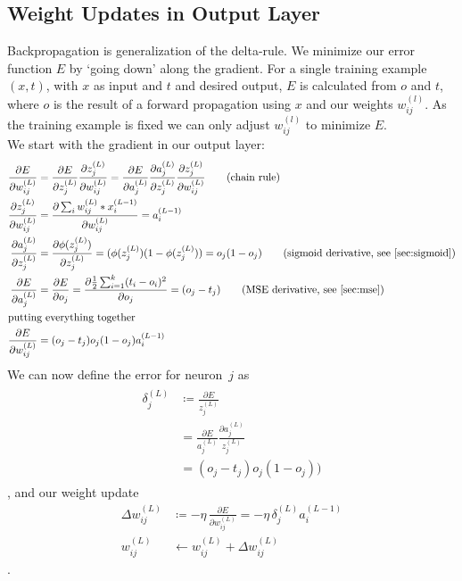 \subsection{Weight Updates in Output Layer}
Backpropagation is generalization of the delta-rule. We minimize our error function $E$ by `going down' along the gradient. For a single training example~$(x, t)$, with $x$ as input and $t$ and desired output, $E$ is calculated from $o$ and $t$, where $o$ is the result of a forward propagation using $x$ and our weights $w_{ij}^{(l)}$. As the training example is fixed we can only adjust $w_{ij}^{(l)}$ to minimize $E$.\\
We start with the gradient in our output layer:
\begin{align}
\frac{\partial E}{\partial w_{ij}^{(L)}} &= \frac{\partial E}{\partial z_j^{(L)}} \frac{\partial z_j^{(L)}}{\partial w_{ij}^{(L)}}
= \frac{\partial E}{\partial a_j^{(L)}} \frac{\partial a_j^{(L)}}{\partial z_j^{(L)}} \frac{\partial z_j^{(L)}}{\partial w_{ij}^{(L)}}
 \tag{chain rule}\\
\frac{\partial z_j^{(L)}}{\partial w_{ij}^{(L)}} &= \frac{\partial \sum_i w_{ij}^{(L)} * x_i^{(L-1)} }{\partial w_{ij}^{(L)}}
= a_i^{(L-1)}\\
\frac{\partial a_j^{(L)}}{\partial z_j^{(L)}} &= \frac{\partial \phi(z_j^{(L)})}{\partial z_j^{(L)}}
= (\phi(z_j^{(L)}) (1 - \phi(z_j^{(L)}))
= o_j (1 - o_j) \tag{sigmoid derivative, see \cref{sec:sigmoid}} \\
\frac{\partial E}{\partial a_j^{(L)}} &= \frac{\partial E}{\partial o_j}
= \frac{\partial \half \sum_{i=1}^k (t_i - o_i)^2}{\partial o_j}
= (o_j - t_j) \tag{MSE derivative, see \cref{sec:mse}}\\
\intertext{putting everything together}
\frac{\partial E}{\partial w_{ij}^{(L)}} &= (o_j - t_j) o_j (1 - o_j) a_i^{(L-1)}
\end{align}
We can now define the error for neuron~$j$ as
\begin{align}
\begin{split}
\delta_j^{(L)} &\coloneqq \frac{\partial E}{z_j^{(L)}}\\
&= \frac{\partial E}{a_j^{(L)}} \frac{\partial a_j^{(L)}}{z_j^{(L)}}\\
&= (o_j - t_j) o_j (1 - o_j))
\end{split}
\end{align}
, and our weight update
\begin{align}
\Delta w_{ij}^{(L)} &\coloneqq - \eta\, \frac{\partial E}{\partial w_{ij}^{(L)}}
= - \eta\, \delta_j^{(L)} a_i^{(L-1)}\\
w_{ij}^{(L)} &\leftarrow w_{ij}^{(L)} + \Delta w_{ij}^{(L)}
\end{align}
.

